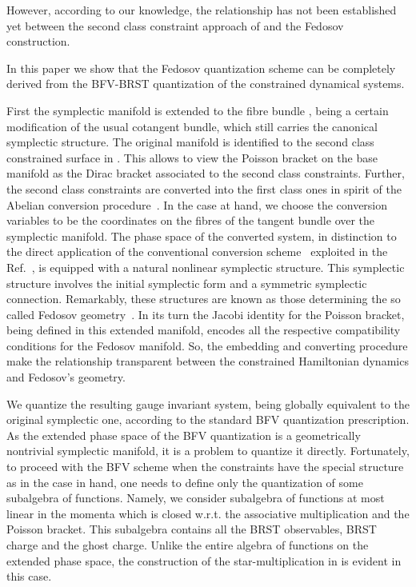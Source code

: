 \documentclass[a4paper,11pt,oneside]{amsart}
\theoremstyle{plain}
\numberwithin{equation}{section} %
\numberwithin{figure}{section} %
\def\mod{{\mathcal T}^*_\rho}
\def\manM{{\mathcal M}}
\def\aA{{ \mathfrak A}}
\begin{document}
\noindent
However, according to our knowledge,  the relationship has not been
established yet between the second class constraint approach of
\cite{[BF89],[FL],[BFF]} and the Fedosov construction.

\noindent
In this paper we show that the Fedosov quantization scheme
can be completely derived from the BFV-BRST quantization of the
constrained dynamical systems.

\noindent
First the symplectic manifold \myHighlight{$\manM$}\coordHE{} is extended to the fibre bundle
\myHighlight{$\mod\manM$}\coordHE{}, being a certain modification of the usual cotangent
bundle, which still carries the canonical symplectic structure.  The
original manifold \myHighlight{$\manM$}\coordHE{} is identified to the second class
constrained surface in \myHighlight{$\mod\manM$}\coordHE{}.  This allows to view the
Poisson bracket on the base manifold as the Dirac bracket associated
to the second class constraints.  Further, the second class
constraints are converted into the first class ones in spirit of the
Abelian conversion procedure~\cite{[BT]}.  In the case at hand, we
choose the conversion variables to be the coordinates on the fibres
of the tangent bundle over the symplectic manifold.  The phase space
of the converted system, in distinction to the direct application of
the conventional conversion scheme~\cite{[BT]} exploited in the
Ref.~\cite{[FL]}, is equipped with a natural nonlinear symplectic
structure.  This symplectic structure involves the initial symplectic
form and a symmetric symplectic connection.  Remarkably,
these structures are known as those determining the so called
Fedosov geometry~\cite{[GRS]}.  In its turn the Jacobi identity
for the Poisson bracket, being defined in this extended manifold, encodes
all the respective compatibility conditions for the Fedosov manifold. So,
the embedding and converting procedure make the relationship
transparent between the constrained Hamiltonian dynamics and
Fedosov's geometry.

\noindent
We quantize the resulting  gauge invariant system, being globally
equivalent to the original symplectic one, according to the standard BFV
quantization prescription.  As the extended phase space of the BFV
quantization is a geometrically nontrivial symplectic manifold, it is a
problem to quantize it directly.  Fortunately, to proceed with the
BFV scheme when the constraints have the special structure as in the case
in hand, one needs to define only the quantization of
some subalgebra of functions.  Namely, we consider subalgebra \myHighlight{$\aA$}\coordHE{}
of functions at most linear in the momenta which is closed w.r.t.
the associative multiplication and the Poisson bracket.  This
subalgebra contains all the BRST observables, BRST charge \myHighlight{$\Omega$}\coordHE{} and
the ghost charge.  Unlike the entire algebra of functions on the
extended phase space, the construction of the star-multiplication
in \myHighlight{$\aA$}\coordHE{} is evident in this case.
\end{document}
